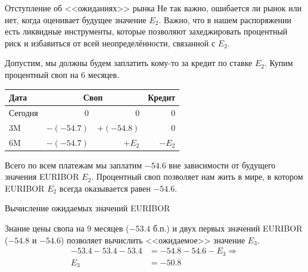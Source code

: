 \documentclass{beamer}
\begin{document}
\begin{frame}{Отступление об <<ожиданиях>> рынка}
\justify
Не так важно, ошибается ли рынок или нет, когда оценивает будущее значение $E_2$. Важно, что в нашем распоряжении есть ликвидные инструменты, которые позволяют захеджировать процентный риск и избавиться от всей неопределённости, связанной с $E_2$.

\justify
Допустим, мы должны будем заплатить кому-то за кредит по ставке $E_2$. Купим процентный своп на 6 месяцев.

\centering
\begin{tabular}{l|r|r|r}
Дата    & \multicolumn{2}{c|}{Своп} & Кредит \\ \hline
Сегодня &          0  &  0            & 0 \\
3M      & $-(-54.7)$  &  $+(-54.8)$   & 0 \\
6M      & $-(-54.7)$  &  $+E_2$       & $-E_2$
\end{tabular}

\justify
Всего по всем платежам мы заплатим $-54.6$ вне зависимости от будущего значения EURIBOR $E_2$. Процентный своп позволяет нам жить в мире, в котором EURIBOR $E_2$ всегда оказывается равен $-54.6$.
\end{frame}



\begin{frame}{Вычисление ожидаемых значений EURIBOR}
\centering
{}

\justify
Знание цены свопа на 9 месяцев ($-53.4$ б.п.) и двух первых значений EURIBOR ($-54.8$ и $-54.6$) позволяет вычислить <<ожидаемое>> значение $E_3$.
\begin{align*}
-53.4 - 53.4 - 53.4 &= -54.8 - 54.6 - E_3 \Rightarrow \\
E_3 &= -50.8
\end{align*}
\end{frame}
\end{document}
